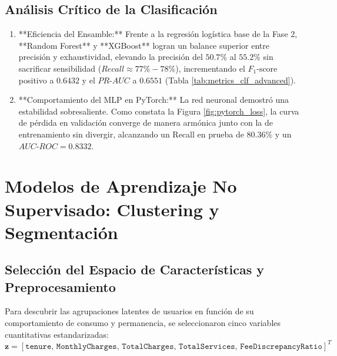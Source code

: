 \documentclass[11pt,letterpaper]{article}
\begin{document}
\subsection{Análisis Crítico de la Clasificación}
\begin{enumerate}
    \item **Eficiencia del Ensamble:** Frente a la regresión logística base de la Fase 2, **Random Forest** y **XGBoost** logran un balance superior entre precisión y exhaustividad, elevando la precisión del $50.7\%$ al $\mathbf{55.2\%}$ sin sacrificar sensibilidad ($Recall \approx 77\% - 78\%$), incrementando el $F_1\text{-score}$ positivo a $\mathbf{0.6432}$ y el $PR\text{-}AUC$ a $\mathbf{0.6551}$ (Tabla \ref{tab:metrics_clf_advanced}).
    \item **Comportamiento del MLP en PyTorch:** La red neuronal demostró una estabilidad sobresaliente. Como constata la Figura \ref{fig:pytorch_loss}, la curva de pérdida en validación converge de manera armónica junto con la de entrenamiento sin divergir, alcanzando un Recall en prueba de $\mathbf{80.36\%}$ y un $AUC\text{-}ROC = 0.8332$.

\end{enumerate}

\section{Modelos de Aprendizaje No Supervisado: Clustering y Segmentación}

\subsection{Selección del Espacio de Características y Preprocesamiento}
Para descubrir las agrupaciones latentes de usuarios en función de su comportamiento de consumo y permanencia, se seleccionaron cinco variables cuantitativas estandarizadas:
\begin{equation}
    \mathbf{z} = \left[ \texttt{tenure}, \, \texttt{MonthlyCharges}, \, \texttt{TotalCharges}, \, \texttt{TotalServices}, \, \texttt{FeeDiscrepancyRatio} \right]^T
\end{equation}
\end{document}
